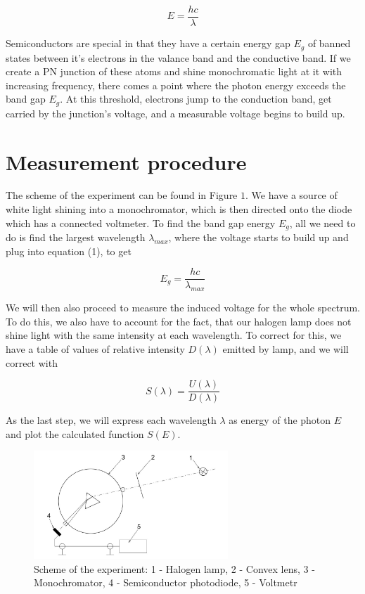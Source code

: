 \documentclass[a4paper,11pt]{article}
\begin{document}
\begin{equation}
    E = \frac{h c}{\lambda}
\end{equation}

Semiconductors are special in that they have a certain energy gap $ E_g $ of banned states between it's electrons in the valance band and the conductive band. If we create a PN junction of these atoms and shine monochromatic light at it with increasing frequency, there comes a point where the photon energy exceeds the band gap $ E_g $. At this threshold, electrons jump to the conduction band, get carried by the junction's voltage, and a measurable voltage begins to build up.
 
\section{Measurement procedure}

The scheme of the experiment can be found in Figure $ 1 $. We have a source of white light shining into a monochromator, which is then directed onto the diode which has a connected voltmeter. To find the band gap energy $ E_g $, all we need to do is find the largest wavelength $ \lambda_{max} $, where the voltage starts to build up and plug into equation (1), to get

\begin{equation}
E_{g} = \frac{h c}{\lambda_{max}}
\end{equation}

\vspace{10pt}

We will then also proceed to measure the induced voltage for the whole spectrum. To do this, we also have to account for the fact, that our halogen lamp does not shine light with the same intensity at each wavelength. To correct for this, we have a table of values of relative intensity $ D(\lambda) $  emitted by lamp, and we will correct with

\begin{equation}
 S(\lambda) = \frac{U(\lambda)}{ D(\lambda) }
\end{equation}

As the last step, we will express each wavelength $ \lambda $ as energy of the photon $ E $ and plot the calculated function $ S(E) $.



\begin{figure}[htpb]
    \centering
    \includegraphics[width=0.65\textwidth]{aparatura.jpg}
    \caption{Scheme of the experiment: 1 - Halogen lamp, 2 - Convex lens, 3 - Monochromator, 4 - Semiconductor photodiode, 5 - Voltmetr}
\end{figure}
\end{document}
